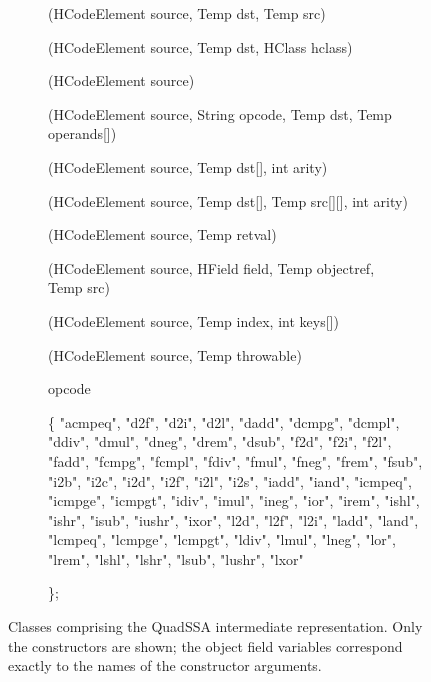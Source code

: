 \documentclass[11pt,notitlepage,twocolumn,twoside]{article}
\begin{document}
\begin{figure*}
{\begin{description}
\item[](HCodeElement source, Temp dst, Temp src)
\item[](HCodeElement source, Temp dst, HClass hclass)
\item[](HCodeElement source)
\item[](HCodeElement source, String opcode, Temp dst, 
                  Temp operands[])
\item[](HCodeElement source, Temp dst[], int arity)
\item[](HCodeElement source, Temp dst[], Temp src[][], int arity)
\item[](HCodeElement source, Temp retval) 
\item[](HCodeElement source, HField field, Temp objectref, \\ 
                 Temp src) 
\item[](HCodeElement source, Temp index, int keys[])
\item[](HCodeElement source, Temp throwable)
\item[]
\item[]  opcode  
\item[] \{  "acmpeq", "d2f", "d2i", "d2l", "dadd", "dcmpg",
"dcmpl", "ddiv", "dmul", "dneg", "drem", "dsub", "f2d", "f2i", "f2l",
"fadd", "fcmpg", "fcmpl", "fdiv", "fmul", "fneg", "frem", "fsub",
"i2b", "i2c", "i2d", "i2f", "i2l", "i2s", "iadd", "iand", "icmpeq",
"icmpge", "icmpgt", "idiv", "imul", "ineg", "ior", "irem", "ishl",
"ishr", "isub", "iushr", "ixor", "l2d", "l2f", "l2i", "ladd", "land",
"lcmpeq", "lcmpge", "lcmpgt", "ldiv", "lmul", "lneg", "lor", "lrem",
"lshl", "lshr", "lsub", "lushr", "lxor"
\item[] \};
\end{description}
}

\caption{Classes comprising the QuadSSA intermediate representation.
Only the constructors are shown; the object field variables correspond
exactly to the names of the constructor arguments.}
\label{fig:classes}
\end{figure*}


\end{document}
